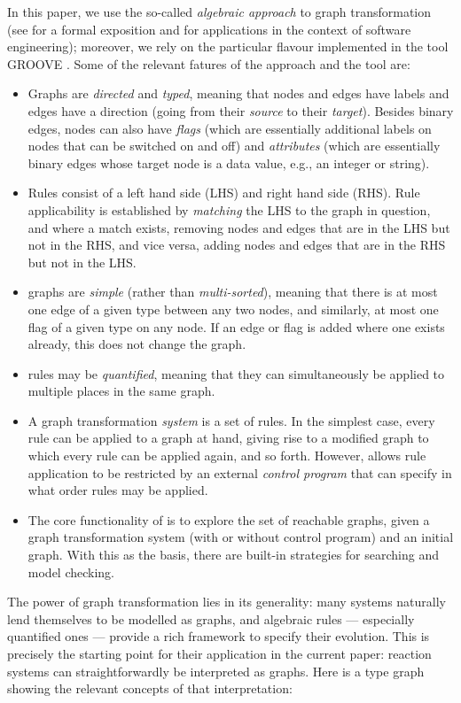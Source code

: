 \documentclass[sn-mathphys-num,a4paper,iicol,lineno,pdflatex]{sn-jnl-hacked}
\theoremstyle{thmstyleone}%
\theoremstyle{thmstyletwo}%
\theoremstyle{thmstylethree}%
\begin{document}
In this paper, we use the so-called \emph{algebraic approach} to graph transformation (see \cite{EhrigEtAl} for a formal exposition and \cite{HeckelTaentzer} for applications in the context of software engineering); moreover, we rely on the particular flavour implemented in the tool GROOVE \cite{GROOVE}. Some of the relevant fatures of the approach and the tool are:
%
\begin{itemize}
\item Graphs are \emph{directed} and \emph{typed}, meaning that nodes and edges have labels and edges have a direction (going from their \emph{source} to their \emph{target}). Besides binary edges, nodes can also have \emph{flags} (which are essentially additional labels on nodes that can be switched on and off) and \emph{attributes} (which are essentially binary edges whose target node is a data value, e.g., an integer or string).

\item Rules consist of a left hand side (LHS) and right hand side (RHS). Rule applicability is established by \emph{matching} the LHS to the graph in question, and where a match exists, removing nodes and edges that are in the LHS but not in the RHS, and vice versa, adding nodes and edges that are in the RHS but not in the LHS.

\item \GROOVE graphs are \emph{simple} (rather than \emph{multi-sorted}), meaning that there is at most one edge of a given type between any two nodes, and similarly, at most one flag of a given type on any node. If an edge or flag is added where one exists already, this does not change the graph.

\item \GROOVE rules may be \emph{quantified}, meaning that they can simultaneously be applied to multiple places in the same graph.

\item A graph transformation \emph{system} is a set of rules. In the simplest case, every rule can be applied to a graph at hand, giving rise to a modified graph to which every rule can be applied again, and so forth. However, \GROOVE allows rule application to be restricted by an external \emph{control program} that can specify in what order rules may be applied.

\item The core functionality of \GROOVE is to explore the set of reachable graphs, given a graph transformation system (with or without control program) and an initial graph. With this as the basis, there are built-in strategies for searching and model checking.
\end{itemize}
%
The power of graph transformation lies in its generality: many systems naturally lend themselves to be modelled as graphs, and algebraic rules --- especially quantified ones --- provide a rich framework to specify their evolution. This is precisely the starting point for their application in the current paper: reaction systems can straightforwardly be interpreted as graphs. Here is a type graph showing the relevant concepts of that interpretation:
\end{document}
